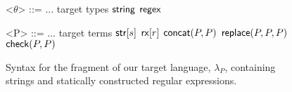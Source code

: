 \documentclass[10pt,preprint]{sigplanconf}
\theoremstyle{definition}
\newcommand{\reduces}{ \Rightarrow }
\newcommand{\lambdap}{\lambda_P}
\newcommand{\sistr}[1]{{\sf rstr}[#1]}
\newcommand{\strin}[1]{\sistr{#1}}
\newcommand{\tsubst}[3]{{\sf replace}(#1,#2,#3)} %
\newcommand{\tcheck}[2]{{\sf check}(#1, #2)}
\renewcommand{\tstr}[1]{{{\sf str}[#1]}}
\newcommand{\tconcat}[2]{{\sf concat}(#1,#2)}
\newcommand{\rx}[1]{ {\sf rx}[#1] }
\newcommand{\str}{{\sf string}}
\newcommand{\regex}{{\sf regex}}
\newcommand{\treduces}{ \Downarrow }
\newcommand{\lcs}{\lambda_{CS}}
\begin{document}
\begin{figure}
\begin{grammar}

<$\theta$> ::= ... \hfill target types \alt
$\str$ \alt $\regex$


<P> ::= ... \hfill target terms \alt
  $\tstr{s}$ \alt
  $\rx{r}$ \alt
  $\tconcat{P}{P}$ \alt
  $\tsubst{P}{P}{P}$ \alt
  $\tcheck{P}{P}$ 
  \end{grammar}
\caption{Syntax for the fragment of our target language, $\lambdap$, containing strings and statically constructed regular expressions.}
\label{fig:lcsSyntax}
\end{figure}

%
%
%
%
%
%
%
\end{document}
